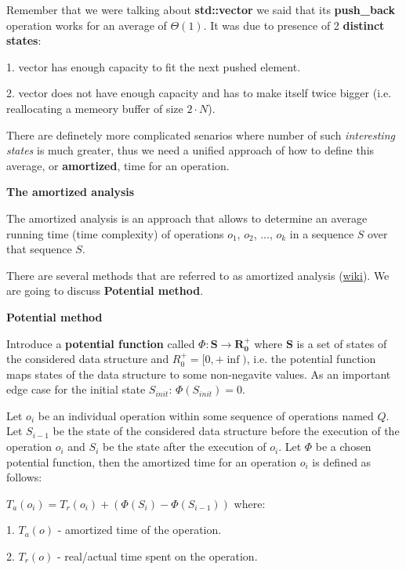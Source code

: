 
Remember that we were talking about \textbf{std::vector} we said that its \textbf{push\_back} operation works for an average of $\Theta(1)$. It was due to presence of 2 \textbf{distinct states}:

1. vector has enough capacity to fit the next pushed element.

2. vector does not have enough capacity and has to make itself twice bigger (i.e. reallocating a memeory buffer of size $2\cdot N$).

There are definetely more complicated senarios where number of such \textit{interesting states} is much greater, thus we need a unified approach of how to define this average, or \textbf{amortized}, time for an operation.

\begin{definition}
    \textbf{The amortized analysis}

    The amortized analysis is an approach that allows to determine an average running time (time complexity) of operations $o_1$, $o_2$, ..., $o_k$ in a sequence $S$ over that sequence $S$.

\end{definition}

There are several methods that are referred to as amortized analysis (\href{https://en.wikipedia.org/wiki/Amortized_analysis}{wiki}). We are going to discuss \textbf{Potential method}.


\begin{definition}
    \textbf{Potential method}

    Introduce a \textbf{potential function} called $\Phi: \mathbf{S} \to \mathbf{R_{0}^{+}}$ where $\mathbf{S}$ is a set of states of the considered data structure and $R_{0}^{+} = [0, +\inf)$, i.e. the potential function maps states of the data structure to some non-negavite values. As an important edge case for the initial state $S_{init}$: $\Phi(S_{init}) = 0$.

    Let $o_i$ be an individual operation within some sequence of operations named $Q$. Let $S_{i-1}$ be the state of the considered data structure before the execution of the operation $o_i$ and $S_{i}$ be the state after the execution of $o_i$. Let $\Phi$ be a chosen potential function, then the amortized time for an operation $o_i$ is defined as follows:

    $ T_{a}(o_i) = T_{r}(o_i) + \left (\Phi(S_{i}) - \Phi(S_{i-1}) \right ) $ where:

    1. $T_{a}(o)$ - amortized time of the operation.

    2. $T_{r}(o)$ - real/actual time spent on the operation.
\end{definition}

